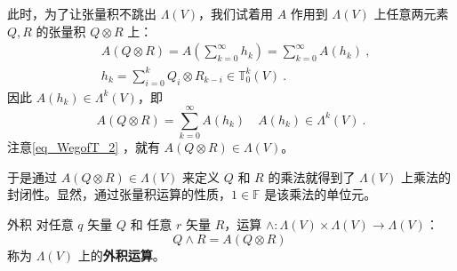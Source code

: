 此时，为了让张量积不跳出 $\Lambda(V)$，我们试着用 $A$ 作用到 $\Lambda(V)$ 上任意两元素 $Q,R$ 的张量积 $Q\otimes R$ 上：
\begin{equation}
\begin{aligned}
&A(Q\otimes R)=A(\sum_{k=0}^\infty h_k)=\sum_{k=0}^\infty  A(h_k)~,\\
&h_k=\sum_{i=0}^k Q_i\otimes R_{k-i}\in\mathbb T_0^k(V)~.
\end{aligned}
\end{equation}
因此 $A(h_k)\in \Lambda^{k}(V)$，即
\begin{equation}
A(Q\otimes R)=\sum_{k=0}^\infty  A(h_k)\quad A(h_k)\in\Lambda^k(V)~.
\end{equation}
注意\autoref{eq_WegofT_2} ，就有 $A(Q\otimes R)\in\Lambda(V)$。

于是通过 $A(Q\otimes R)\in\Lambda(V)$ 来定义 $Q$ 和 $R$ 的乘法就得到了 $\Lambda(V)$ 上乘法的封闭性。显然，通过张量积运算的性质，$1\in\mathbb F$ 是该乘法的单位元。
\begin{definition}{外积}\label{def_WegofT_1}
对任意 $q$ 矢量 $Q$ 和 任意 $r$ 矢量 $R$，运算 $\wedge:\Lambda(V)\times\Lambda(V)\rightarrow\Lambda(V)$：
\begin{equation}
Q\wedge R=A(Q\otimes R)~
\end{equation}
称为 $\Lambda(V)$ 上的\textbf{外积运算}。
\end{definition}
